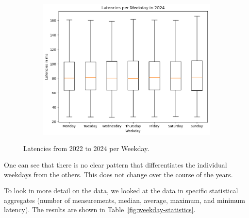 \begin{figure}
\begin{subfigure}[b]{0.32\linewidth}
	\end{subfigure}
	\begin{subfigure}[b]{0.32\linewidth}
		\includegraphics[width=\linewidth]{chapters/4-results/latency/img/latency_2024_weekdays.png}
	\end{subfigure}
	\caption{Latencies from 2022 to 2024 per Weekday.}
	\label{fig:latencies-per-weekday}
\end{figure}

One can see that there is no clear pattern that differentiates the individual
weekdays from the others. This does not change over the course of the years.

To look in more detail on the data, we looked at the data in specific
statistical aggregates (number of measurements, median, average, maximum, and
minimum latency). The results are shown in Table~\ref{fig:weekday-statistics}.

